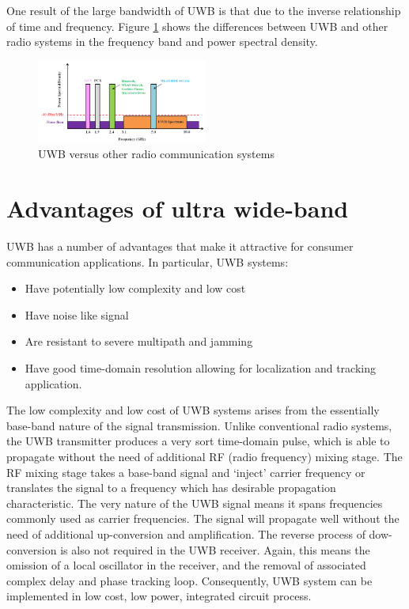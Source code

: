 \documentclass[\main/main.tex]{subfiles}
\begin{document}
One result of the large bandwidth of UWB is that due to the inverse relationship of
time and frequency. Figure \ref{fig:uwb_versus_other_radio_communication_systems} shows the differences between UWB and other radio systems in the frequency band and power spectral density.

\begin{figure}[H]
    \centering
    \includegraphics[width=0.5\textwidth]{uwb_versus_other_radio_communication_systems.png}
    \caption{UWB versus other radio communication systems}
    \label{fig:uwb_versus_other_radio_communication_systems}
\end{figure}

\section{Advantages of ultra wide-band}

UWB has a number of advantages that make it attractive for consumer communication applications. In particular, UWB systems:
\begin{itemize}
    \item Have potentially low complexity and low cost
    \item Have noise like signal
    \item Are resistant to severe multipath and jamming
    \item Have good time-domain resolution allowing for localization and tracking application.
\end{itemize}

The low complexity and low cost of UWB systems arises from the essentially base-band nature of the signal transmission. Unlike conventional radio systems, the UWB transmitter produces a very sort time-domain pulse, which is able to propagate without the need of additional RF (radio frequency) mixing stage. The RF mixing stage takes a base-band signal and `inject' carrier frequency or translates the signal to a frequency which has desirable propagation characteristic. The very nature of the UWB signal means it spans frequencies commonly used as carrier frequencies. The signal will propagate well without the need of additional up-conversion and amplification. The reverse process of dow-conversion is also not required in the UWB receiver. Again, this means the omission of a local oscillator in the receiver, and the removal of associated complex delay and phase tracking loop. Consequently, UWB system can be implemented in low cost, low power, integrated circuit process.
\end{document}
